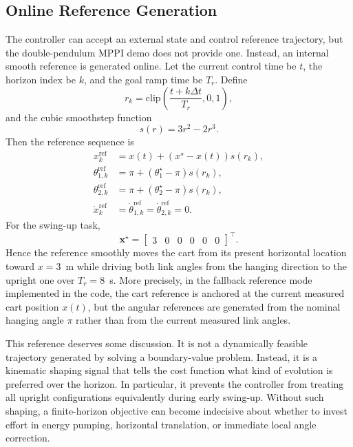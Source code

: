 \documentclass[conference]{IEEEtran}
\begin{document}
\subsection{Online Reference Generation}
The controller can accept an external state and control reference trajectory, but the double-pendulum MPPI demo does not provide one. Instead, an internal smooth reference is generated online. Let the current control time be $t$, the horizon index be $k$, and the goal ramp time be $T_r$. Define
\begin{equation}
r_k = \mathrm{clip}\!\left(\frac{t + k\Delta t}{T_r}, 0, 1\right),
\end{equation}
and the cubic smoothstep function
\begin{equation}
s(r) = 3r^2 - 2r^3.
\end{equation}
Then the reference sequence is
\begin{align}
x_k^{\mathrm{ref}} &= x(t) + \left(x^\star - x(t)\right) s(r_k), \\
\theta_{1,k}^{\mathrm{ref}} &= \pi + \left(\theta_1^\star - \pi\right) s(r_k), \\
\theta_{2,k}^{\mathrm{ref}} &= \pi + \left(\theta_2^\star - \pi\right) s(r_k), \\
\dot{x}_k^{\mathrm{ref}} &= \dot{\theta}_{1,k}^{\mathrm{ref}} = \dot{\theta}_{2,k}^{\mathrm{ref}} = 0.
\end{align}
For the swing-up task,
\begin{equation}
\bm{x}^\star = \begin{bmatrix} 3 & 0 & 0 & 0 & 0 & 0 \end{bmatrix}^\top.
\end{equation}
Hence the reference smoothly moves the cart from its present horizontal location toward $x=3$~m while driving both link angles from the hanging direction to the upright one over $T_r = 8$~s. More precisely, in the fallback reference mode implemented in the code, the cart reference is anchored at the current measured cart position $x(t)$, but the angular references are generated from the nominal hanging angle $\pi$ rather than from the current measured link angles.

This reference deserves some discussion. It is not a dynamically feasible trajectory generated by solving a boundary-value problem. Instead, it is a kinematic shaping signal that tells the cost function what kind of evolution is preferred over the horizon. In particular, it prevents the controller from treating all upright configurations equivalently during early swing-up. Without such shaping, a finite-horizon objective can become indecisive about whether to invest effort in energy pumping, horizontal translation, or immediate local angle correction.
\end{document}
